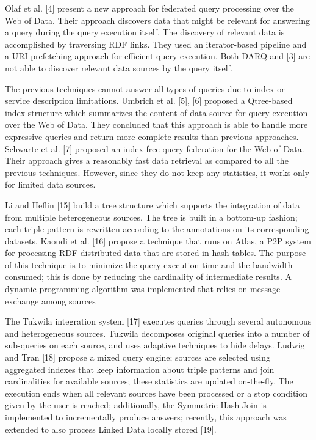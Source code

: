\documentclass{sig-alternate}  %
\begin{document}
Olaf et al. {[}4{]} present a new approach for federated query processing
over the Web of Data. Their approach discovers data that might be
relevant for answering a query during the query execution itself.
The discovery of relevant data is accomplished by traversing RDF links.
They used an iterator-based pipeline and a URI prefetching approach
for efficient query execution. Both DARQ and {[}3{]} are not able
to discover relevant data sources by the query itself.

The previous techniques cannot answer all types of queries due to
index or service description limitations. Umbrich et al. {[}5{]},
{[}6{]} proposed a Qtree-based index structure which summarizes the
content of data source for query execution over the Web of Data. They
concluded that this approach is able to handle more expressive queries
and return more complete results than previous approaches. Schwarte
et al. {[}7{]} proposed an index-free query federation for the Web
of Data. Their approach gives a reasonably fast data retrieval as
compared to all the previous techniques. However, since they do not
keep any statistics, it works only for limited data sources.

Li and Heflin {[}15{]} build a tree structure which supports the integration
of data from multiple heterogeneous sources. The tree is built in
a bottom-up fashion; each triple pattern is rewritten according to
the annotations on its corresponding datasets. Kaoudi et al. {[}16{]}
propose a technique that runs on Atlas, a P2P system for processing
RDF distributed data that are stored in hash tables. The purpose of
this technique is to minimize the query execution time and the bandwidth
consumed; this is done by reducing the cardinality of intermediate
results. A dynamic programming algorithm was implemented that relies
on message exchange among sources

The Tukwila integration system {[}17{]} executes queries through several
autonomous and heterogeneous sources. Tukwila decomposes original
queries into a number of sub-queries on each source, and uses adaptive
techniques to hide delays. Ludwig and Tran {[}18{]} propose a mixed
query engine; sources are selected using aggregated indexes that keep
information about triple patterns and join cardinalities for available
sources; these statistics are updated on-the-fly. The execution ends
when all relevant sources have been processed or a stop condition
given by the user is reached; additionally, the Symmetric Hash Join
is implemented to incrementally produce answers; recently, this approach
was extended to also process Linked Data locally stored {[}19{]}.
\end{document}
